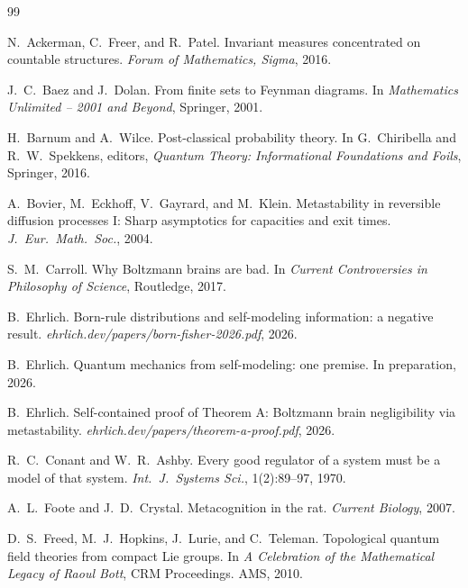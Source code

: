 \documentclass[12pt]{article}
\theoremstyle{remark}
\begin{document}
\begin{thebibliography}{99}

N.~Ackerman, C.~Freer, and R.~Patel.
\newblock Invariant measures concentrated on countable structures.
\newblock \emph{Forum of Mathematics, Sigma}, 2016.

J.~C.~Baez and J.~Dolan.
\newblock From finite sets to {F}eynman diagrams.
\newblock In \emph{Mathematics Unlimited -- 2001 and Beyond}, Springer, 2001.

H.~Barnum and A.~Wilce.
\newblock Post-classical probability theory.
\newblock In G.~Chiribella and R.~W.~Spekkens, editors, \emph{Quantum Theory: Informational Foundations and Foils}, Springer, 2016.

A.~Bovier, M.~Eckhoff, V.~Gayrard, and M.~Klein.
\newblock Metastability in reversible diffusion processes {I}: Sharp asymptotics for capacities and exit times.
\newblock \emph{J.~Eur.\ Math.\ Soc.}, 2004.

S.~M.~Carroll.
\newblock Why {B}oltzmann brains are bad.
\newblock In \emph{Current Controversies in Philosophy of Science}, Routledge, 2017.

B.~Ehrlich.
\newblock Born-rule distributions and self-modeling information: a negative result.
\newblock \emph{ehrlich.dev/papers/born-fisher-2026.pdf}, 2026.

B.~Ehrlich.
\newblock Quantum mechanics from self-modeling: one premise.
\newblock In preparation, 2026.

B.~Ehrlich.
\newblock Self-contained proof of {T}heorem {A}: {B}oltzmann brain negligibility via metastability.
\newblock \emph{ehrlich.dev/papers/theorem-a-proof.pdf}, 2026.

R.~C.~Conant and W.~R.~Ashby.
\newblock Every good regulator of a system must be a model of that system.
\newblock \emph{Int.\ J.\ Systems Sci.}, 1(2):89--97, 1970.

A.~L.~Foote and J.~D.~Crystal.
\newblock Metacognition in the rat.
\newblock \emph{Current Biology}, 2007.

D.~S.~Freed, M.~J.~Hopkins, J.~Lurie, and C.~Teleman.
\newblock Topological quantum field theories from compact {L}ie groups.
\newblock In \emph{A Celebration of the Mathematical Legacy of Raoul Bott}, CRM Proceedings. AMS, 2010.


\end{thebibliography}
\end{document}
